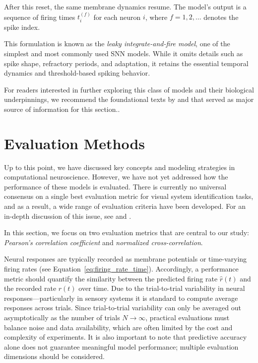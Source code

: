 After this reset, the same membrane dynamics resume. The model's output is a sequence of firing times $t^{(f)}_i$ for each neuron $i$, where $f = 1, 2, \dots$ denotes the spike index.

This formulation is known as the \emph{leaky integrate-and-fire model}, one of the simplest and most commonly used SNN models. While it omits details such as spike shape, refractory periods, and adaptation, it retains the essential temporal dynamics and threshold-based spiking behavior.

For readers interested in further exploring this class of models and their biological underpinnings, we recommend the foundational texts by \citet{dayan2005theoretical} and \citet{gerstner2002spiking} that served as major source of information for this section..

\section{Evaluation Methods}
\label{sec:evaluation_methods}

Up to this point, we have discussed key concepts and modeling strategies in computational neuroscience. However, we have not yet addressed how the performance of these models is evaluated. There is currently no universal consensus on a single best evaluation metric for visual system identification tasks, and as a result, a wide range of evaluation criteria have been developed. For an in-depth discussion of this issue, see \citet{pospisil2021eval} and \citet{Carandini10577}.

In this section, we focus on two evaluation metrics that are central to our study: \emph{Pearson's correlation coefficient} and \emph{normalized cross-correlation}.

Neural responses are typically recorded as membrane potentials or time-varying firing rates (see Equation~\ref{eq:firing_rate_time}). Accordingly, a performance metric should quantify the similarity between the predicted firing rate $\hat{r}(t)$ and the recorded rate $r(t)$ over time. Due to the trial-to-trial variability in neural responses—particularly in sensory systems it is standard to compute average responses across trials. Since trial-to-trial variability can only be averaged out asymptotically as the number of trials $N \to \infty$, practical evaluations must balance noise and data availability, which are often limited by the cost and complexity of experiments. It is also important to note that predictive accuracy alone does not guarantee meaningful model performance; multiple evaluation dimensions should be considered.

